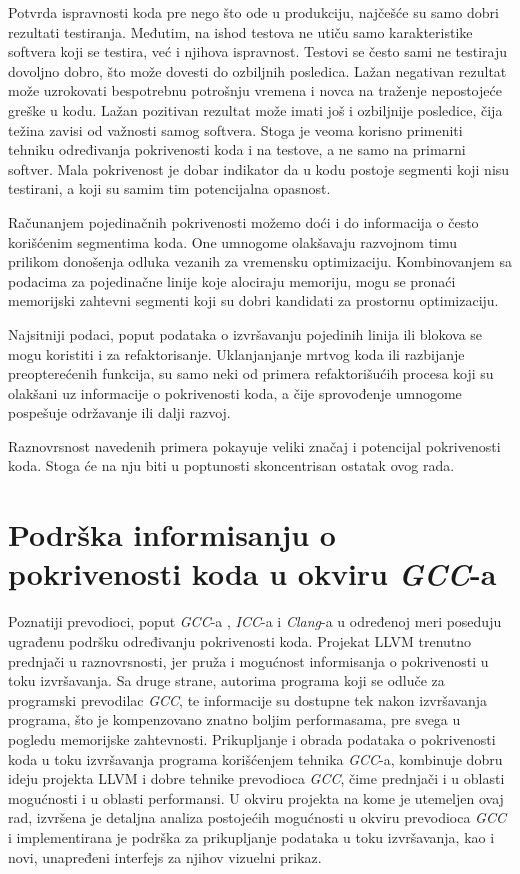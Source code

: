 \documentclass[12pt,oneside]{memoir}
\newcommand{\strano}[1]{\textit{#1}}
\begin{document}
Potvrda ispravnosti koda pre nego što ode u produkciju, najčešće su samo dobri rezultati testiranja. Međutim, na ishod testova ne utiču samo karakteristike softvera koji se testira, već i njihova ispravnost. Testovi se često sami ne testiraju dovoljno dobro, što može dovesti do ozbiljnih posledica. Lažan negativan rezultat može uzrokovati bespotrebnu potrošnju vremena i novca na traženje nepostojeće greške u kodu. Lažan pozitivan rezultat može imati još i ozbiljnije posledice, čija težina zavisi od važnosti samog softvera. Stoga je veoma korisno primeniti tehniku određivanja pokrivenosti koda i na testove, a ne samo na primarni softver. Mala pokrivenost je dobar indikator da u kodu postoje segmenti koji nisu testirani, a koji su samim tim potencijalna opasnost. 

Računanjem pojedinačnih pokrivenosti možemo doći i do informacija o često korišćenim segmentima koda. One umnogome olakšavaju razvojnom timu prilikom donošenja odluka vezanih za vremensku optimizaciju. Kombinovanjem sa podacima za pojedinačne linije koje alociraju memoriju, mogu se pronaći memorijski zahtevni segmenti koji su dobri kandidati za prostornu optimizaciju.

Najsitniji podaci, poput podataka o izvršavanju pojedinih linija ili blokova se mogu koristiti i za refaktorisanje. Uklanjanjanje mrtvog koda ili razbijanje preopterećenih funkcija, su samo neki od primera refaktorišućih procesa koji su olakšani uz informacije o pokrivenosti koda, a čije sprovođenje umnogome pospešuje održavanje ili dalji razvoj.

Raznovrsnost navedenih primera pokayuje veliki značaj i potencijal pokrivenosti koda. Stoga će na nju biti u poptunosti skoncentrisan ostatak ovog rada. 


\chapter{Podrška informisanju o pokrivenosti koda u okviru \strano{GCC}-a}
\label{chp:ideja}


Poznatiji prevodioci, poput \strano{GCC}-a \cite{GCC}, \strano{ICC}-a \cite{ICC} i \strano{Clang}-a \cite{CLANG} u određenoj meri poseduju ugrađenu podršku određivanju pokrivenosti koda. Projekat LLVM trenutno prednjači u raznovrsnosti, jer pruža i mogućnost informisanja o pokrivenosti u toku izvršavanja. Sa druge strane, autorima programa koji se odluče za programski prevodilac \strano{GCC}, te informacije su dostupne tek nakon izvršavanja programa, što je kompenzovano znatno boljim performasama, pre svega u pogledu memorijske zahtevnosti. Prikupljanje i obrada podataka o pokrivenosti koda u toku izvršavanja programa korišćenjem tehnika \strano{GCC}-a, kombinuje dobru ideju projekta LLVM i dobre tehnike prevodioca \strano{GCC}, čime prednjači i u oblasti mogućnosti i u oblasti performansi. U okviru projekta na kome je utemeljen ovaj rad, izvršena je detaljna analiza postojećih mogućnosti u okviru prevodioca \strano{GCC} i implementirana je podrška za prikupljanje podataka u toku izvršavanja, kao i novi, unapređeni interfejs za njihov vizuelni prikaz.
\end{document}
